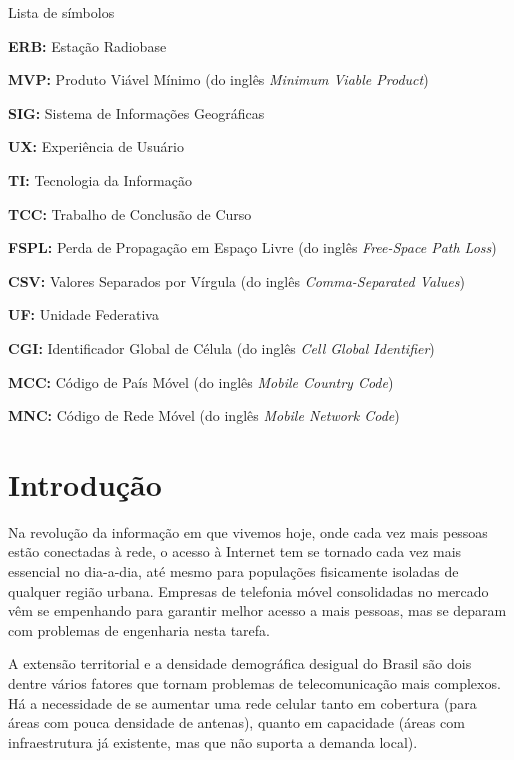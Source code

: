 \documentclass[]{politex}
\newcommand*\NewPage{\newpage\null\thispagestyle{empty}\newpage}
\begin{document}
\begin{pretextualsection}{Lista de símbolos}

\textbf{ERB:} Estação Radiobase

\textbf{MVP:} Produto Viável Mínimo (do inglês \textit{Minimum Viable Product})

\textbf{SIG:} Sistema de Informações Geográficas

\textbf{UX:} Experiência de Usuário

\textbf{TI:} Tecnologia da Informação

\textbf{TCC:} Trabalho de Conclusão de Curso

\textbf{FSPL:} Perda de Propagação em Espaço Livre (do inglês \textit{Free-Space
Path Loss})

\textbf{CSV:} Valores Separados por Vírgula (do inglês \textit{Comma-Separated
Values})

\textbf{UF:} Unidade Federativa

\textbf{CGI:} Identificador Global de Célula (do inglês \textit{Cell Global
Identifier})

\textbf{MCC:} Código de País Móvel (do inglês \textit{Mobile Country Code})

\textbf{MNC:} Código de Rede Móvel (do inglês \textit{Mobile Network Code})

\end{pretextualsection}

\sumario
\NewPage



\chapter{Introdução}

Na revolução da informação em que vivemos hoje, onde cada vez mais pessoas estão
conectadas à rede, o acesso à Internet tem se tornado cada vez mais essencial no
dia-a-dia, até mesmo para populações fisicamente isoladas de qualquer região
urbana. Empresas de telefonia móvel consolidadas no mercado vêm se empenhando
para garantir melhor acesso a mais pessoas, mas se deparam com problemas de
engenharia nesta tarefa.

A extensão territorial e a densidade demográfica desigual do Brasil são dois
dentre vários fatores que tornam problemas de telecomunicação mais complexos. Há
a necessidade de se aumentar uma rede celular tanto em cobertura (para áreas com
pouca densidade de antenas), quanto em capacidade (áreas com infraestrutura já
existente, mas que não suporta a demanda local).
\end{document}
